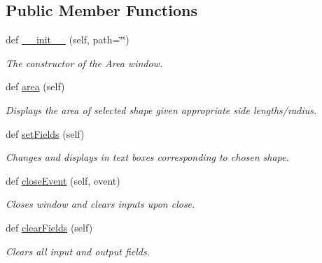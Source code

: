 \subsection*{Public Member Functions}
\begin{DoxyCompactItemize}
\item 
def \hyperlink{classarea__ui_1_1_area_window_a4147cce2b2137dde0a7ac73901b8d9a4}{\+\_\+\+\_\+init\+\_\+\+\_\+} (self, path=\char`\"{}\char`\"{})
\begin{DoxyCompactList}\small\item\em The constructor of the Area window. \end{DoxyCompactList}\item 
def \hyperlink{classarea__ui_1_1_area_window_af95844b38370da348b28e9b1238467ad}{area} (self)
\begin{DoxyCompactList}\small\item\em Displays the area of selected shape given appropriate side lengths/radius. \end{DoxyCompactList}\item 
\mbox{\label{classarea__ui_1_1_area_window_a70280ac8401fee504fbda46e76d086ad}} 
def \hyperlink{classarea__ui_1_1_area_window_a70280ac8401fee504fbda46e76d086ad}{set\+Fields} (self)
\begin{DoxyCompactList}\small\item\em Changes and displays in text boxes corresponding to chosen shape. \end{DoxyCompactList}\item 
\mbox{\label{classarea__ui_1_1_area_window_a4efe946ec3a7255748b744051f0e8c38}} 
def \hyperlink{classarea__ui_1_1_area_window_a4efe946ec3a7255748b744051f0e8c38}{close\+Event} (self, event)
\begin{DoxyCompactList}\small\item\em Closes window and clears inputs upon close. \end{DoxyCompactList}\item 
\mbox{\label{classarea__ui_1_1_area_window_a241a4c79afbd450fb38991a64de8afd6}} 
def \hyperlink{classarea__ui_1_1_area_window_a241a4c79afbd450fb38991a64de8afd6}{clear\+Fields} (self)
\begin{DoxyCompactList}\small\item\em Clears all input and output fields. \end{DoxyCompactList}\end{DoxyCompactItemize}

